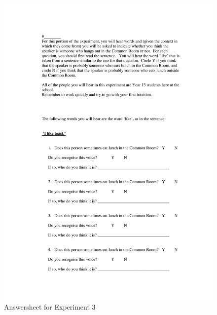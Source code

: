 \begin{figure}
	\centering
		\includegraphics[width=5in]{images/Exp3page1.pdf}
		\caption{Answersheet for Experiment 3}
			\label{x3p1}
\end{figure}


